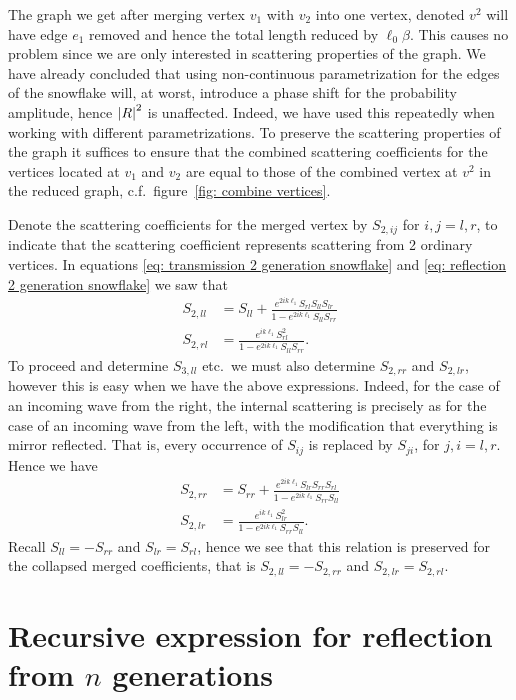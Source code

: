 The graph we get after merging vertex $v_1$ with $v_2$ into one vertex, denoted $v^2$ will have edge $e_1$ removed and hence the total length reduced by $\ell_0\beta$. This causes no problem since we are only interested in scattering properties of the graph. We have already concluded that using non-continuous parametrization for the edges of the snowflake will, at worst, introduce a phase shift for the probability amplitude, hence $\left\lvert R\right\rvert^2$ is unaffected. Indeed, we have used this repeatedly when working with different parametrizations. To preserve the scattering properties of the graph it suffices to ensure that the combined scattering coefficients for the vertices located at $v_1$ and $v_2$ are equal to those of the combined vertex at $v^2$ in the reduced graph, c.f.\ figure~\ref{fig: combine vertices}.

Denote the scattering coefficients for the merged vertex by $S_{2,ij}$ for $i,j=l,r$, to indicate that the scattering coefficient represents scattering from 2 ordinary vertices. In equations \eqref{eq: transmission 2 generation snowflake} and \eqref{eq: reflection 2 generation snowflake} we saw that
\begin{align*}
  S_{2,ll} &= S_{ll} + \frac{e^{2ik\ell_1} S_{rl} S_{ll} S_{lr}}{1 - e^{2ik\ell_1} S_{ll} S_{rr}} \\
  S_{2,rl} &= \frac{e^{ik\ell_1} S_{rl}^2}{1 - e^{2ik\ell_1} S_{ll} S_{rr}}.
\end{align*}
To proceed and determine $S_{3,ll}$ etc.\ we must also determine $S_{2,rr}$ and $S_{2,lr}$, however this is easy when we have the above expressions. Indeed, for the case of an incoming wave from the right, the internal scattering is precisely as for the case of an incoming wave from the left, with the modification that everything is mirror reflected. That is, every occurrence of $S_{ij}$ is replaced by $S_{ji}$, for $j,i=l,r$. Hence we have
\begin{align*}
  S_{2,rr} &= S_{rr} + \frac{e^{2ik\ell_1} S_{lr} S_{rr} S_{rl}}{1 - e^{2ik\ell_1} S_{rr} S_{ll}} \\
  S_{2,lr} &= \frac{e^{ik\ell_1} S_{lr}^2}{1 - e^{2ik\ell_1} S_{rr} S_{ll}}.
\end{align*}
Recall $S_{ll} = -S_{rr}$ and $S_{lr} = S_{rl}$, hence we see that this relation is preserved for the collapsed merged coefficients, that is $S_{2,ll} = -S_{2,rr}$ and $S_{2,lr} = S_{2,rl}$.



\section{Recursive expression for reflection from $n$ generations}


